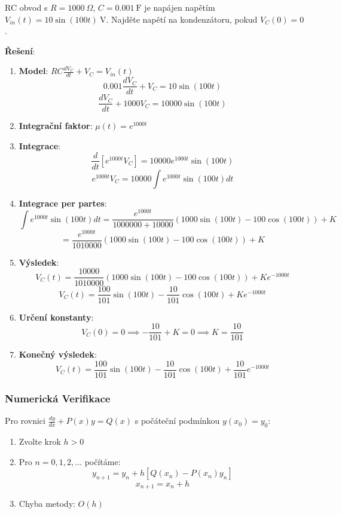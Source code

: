 \begin{example}
RC obvod s $R = 1000\ \Omega$, $C = 0.001\ \mathrm{F}$ je napájen napětím $V_{in}(t) = 10\sin(100t)\ \mathrm{V}$. Najděte napětí na kondenzátoru, pokud $V_C(0) = 0$.
\vspace{0.3\baselineskip}

\textbf{Řešení}: 
\begin{enumerate}
\item \textbf{Model}: $RC\frac{dV_C}{dt} + V_C = V_{in}(t)$
\[
0.001\frac{dV_C}{dt} + V_C = 10\sin(100t)
\]
\[
\frac{dV_C}{dt} + 1000V_C = 10000\sin(100t)
\]

\item \textbf{Integrační faktor}: $\mu(t) = e^{1000t}$

\item \textbf{Integrace}:
\[
\frac{d}{dt}[e^{1000t}V_C] = 10000e^{1000t}\sin(100t)
\]
\[
e^{1000t}V_C = 10000\int e^{1000t}\sin(100t)dt
\]

\item \textbf{Integrace per partes}:
\[
\int e^{1000t}\sin(100t)dt = \frac{e^{1000t}}{1000000 + 10000}(1000\sin(100t) - 100\cos(100t)) + K
\]
\[
= \frac{e^{1000t}}{1010000}(1000\sin(100t) - 100\cos(100t)) + K
\]

\item \textbf{Výsledek}:
\[
V_C(t) = \frac{10000}{1010000}(1000\sin(100t) - 100\cos(100t)) + Ke^{-1000t}
\]
\[
V_C(t) = \frac{100}{101}\sin(100t) - \frac{10}{101}\cos(100t) + Ke^{-1000t}
\]

\item \textbf{Určení konstanty}:
\[
V_C(0) = 0 \implies -\frac{10}{101} + K = 0 \implies K = \frac{10}{101}
\]

\item \textbf{Konečný výsledek}:
\[
V_C(t) = \frac{100}{101}\sin(100t) - \frac{10}{101}\cos(100t) + \frac{10}{101}e^{-1000t}
\]
\end{enumerate}
\end{example}

\vspace{0.8\baselineskip}

\subsubsection{Numerická Verifikace}
\label{subsubsec:numericka-verifikace}

\begin{method}
\label{met:euler-linearni}
Pro rovnici $\frac{dy}{dx} + P(x)y = Q(x)$ s počáteční podmínkou $y(x_0) = y_0$:

\begin{enumerate}
\item Zvolte krok $h > 0$
\item Pro $n = 0, 1, 2, \dots$ počítáme:
\[
y_{n+1} = y_n + h[Q(x_n) - P(x_n)y_n]
\]
\[
x_{n+1} = x_n + h
\]
\item Chyba metody: $O(h)$
\end{enumerate}
\end{method}

